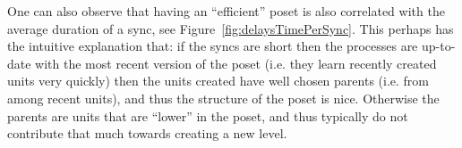 \documentclass[a4paper,10pt]{article}
\begin{document}
				One can also observe that having an ``efficient'' poset is also correlated with the average duration of a sync, see Figure~\ref{fig:delaysTimePerSync}.
				This perhaps has the intuitive explanation that: if the syncs are short then the processes are up-to-date with the most recent version of the poset (i.e. they learn recently created units very quickly) then the units created have well chosen parents (i.e. from among recent units), and thus the structure of the poset is nice.
				Otherwise the parents are units that are ``lower'' in the poset, and thus typically do not contribute that much towards creating a new level.
\end{document}
